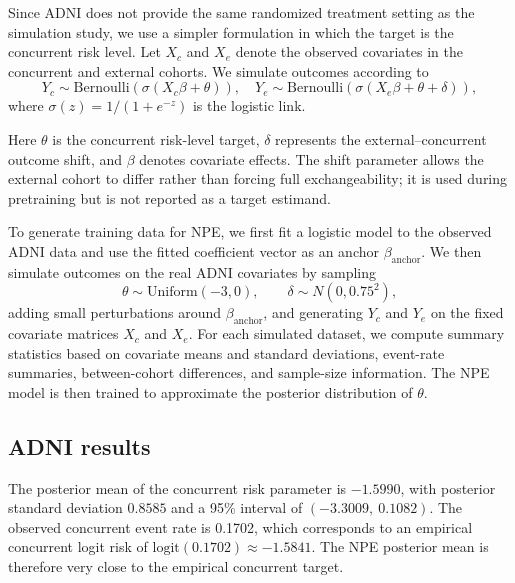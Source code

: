 Since ADNI does not provide the same randomized treatment setting as the
simulation study, we use a simpler formulation in which the target is the
concurrent risk level. Let $X_c$ and $X_e$ denote the observed covariates in
the concurrent and external cohorts. We simulate outcomes according to
\begin{equation}
    Y_c \sim \mathrm{Bernoulli}\!\left(\sigma(X_c\beta + \theta)\right), \quad
Y_e \sim \mathrm{Bernoulli}\!\left(\sigma(X_e\beta + \theta + \delta)\right),
\end{equation}
where $\sigma(z)=1/(1+e^{-z})$ is the logistic link.

Here $\theta$ is the concurrent risk-level target, $\delta$ represents the
external--concurrent outcome shift, and $\beta$ denotes covariate effects.
The shift parameter allows the external cohort to differ rather than forcing
full exchangeability; it is used during pretraining but is not reported as a
target estimand.

To generate training data for NPE, we first fit a logistic model to the
observed ADNI data and use the fitted coefficient vector as an anchor
$\beta_{\mathrm{anchor}}$. We then simulate outcomes on the real ADNI
covariates by sampling
\[
\theta \sim \mathrm{Uniform}(-3,0), \qquad
\delta \sim N(0,0.75^2),
\]
adding small perturbations around $\beta_{\mathrm{anchor}}$, and generating
$Y_c$ and $Y_e$ on the fixed covariate matrices $X_c$ and $X_e$. For each
simulated dataset, we compute summary statistics based on covariate means and
standard deviations, event-rate summaries, between-cohort differences, and
sample-size information. The NPE model is then trained to approximate the
posterior distribution of $\theta$.

\subsection{ADNI results}

The posterior mean of the concurrent risk parameter is $-1.5990$, with
posterior standard deviation $0.8585$ and a 95\% interval of
$(-3.3009,\ 0.1082)$. The observed concurrent event rate is 0.1702, which
corresponds to an empirical concurrent logit risk of
$\mathrm{logit}(0.1702) \approx -1.5841$.
The NPE posterior mean is therefore very close to the empirical concurrent
target.

